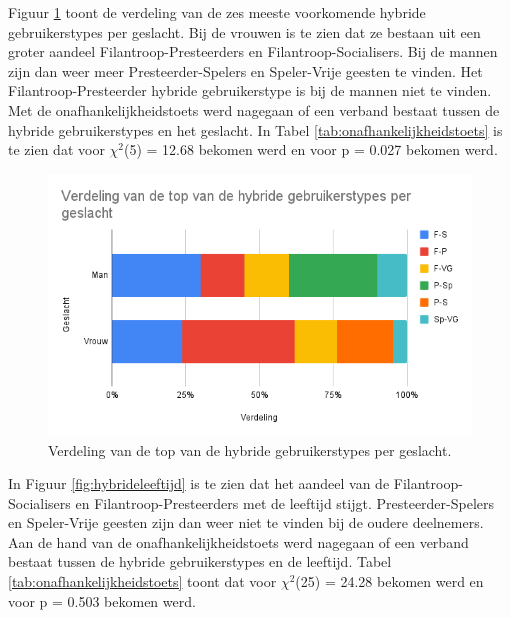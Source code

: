 Figuur \ref{fig:hybridegeslacht} toont de verdeling van de zes meeste voorkomende hybride gebruikerstypes per geslacht. Bij de vrouwen is te zien dat ze bestaan uit een groter aandeel Filantroop-Presteerders en Filantroop-Socialisers. Bij de mannen zijn dan weer meer Presteerder-Spelers en Speler-Vrije geesten te vinden. Het Filantroop-Presteerder hybride gebruikerstype is bij de mannen niet te vinden. Met de onafhankelijkheidstoets werd nagegaan of een verband bestaat tussen de hybride gebruikerstypes en het geslacht. In Tabel \ref{tab:onafhankelijkheidstoets} is te zien dat voor $\chi^2$(5) = 12.68 bekomen werd en voor p = 0.027 bekomen werd.

\begin{figure}
    \includegraphics[width=\linewidth]{HybrideGeslacht.png}
    \caption{Verdeling van de top van de hybride gebruikerstypes per geslacht.}
    \label{fig:hybridegeslacht}
\end{figure}

In Figuur \ref{fig:hybrideleeftijd} is te zien dat het aandeel van de Filantroop-Socialisers en Filantroop-Presteerders met de leeftijd stijgt. Presteerder-Spelers en Speler-Vrije geesten zijn dan weer niet te vinden bij de oudere deelnemers. Aan de hand van de onafhankelijkheidstoets werd nagegaan of een verband bestaat tussen de hybride gebruikerstypes en de leeftijd. Tabel \ref{tab:onafhankelijkheidstoets} toont dat voor $\chi^2$(25) = 24.28 bekomen werd en voor p = 0.503 bekomen werd.

